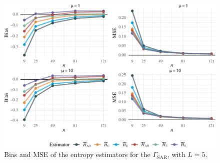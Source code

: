 \begin{figure}[htb]
{\centering \includegraphics[width=0.8\linewidth]{../../Figures/PDF/Plot_bias_mse_gi0-2} 

}
\caption{Bias and MSE of the entropy estimators for the $\Gamma_{\text{SAR}}$, with $L=5$.}\label{fig:Plot_bias_mse_gi0}
\end{figure}


